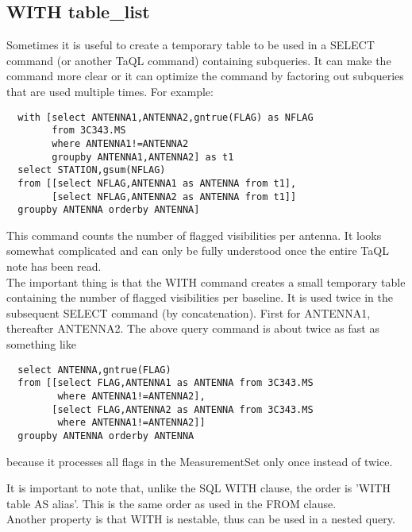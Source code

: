 \subsection{\label{TAQL:WITH}WITH table\_list}
Sometimes it is useful to create a temporary table to be used
in a SELECT command (or another TaQL command) containing
subqueries. It can make the command more clear or it can optimize the
command by factoring out subqueries that are used multiple times.
For example:
\begin{verbatim}
  with [select ANTENNA1,ANTENNA2,gntrue(FLAG) as NFLAG
        from 3C343.MS
        where ANTENNA1!=ANTENNA2
        groupby ANTENNA1,ANTENNA2] as t1
  select STATION,gsum(NFLAG)
  from [[select NFLAG,ANTENNA1 as ANTENNA from t1],
        [select NFLAG,ANTENNA2 as ANTENNA from t1]]
  groupby ANTENNA orderby ANTENNA]
\end{verbatim}
This command counts the number of flagged visibilities per antenna.
It looks somewhat complicated and can only be fully understood
once the entire TaQL note has been read.
\\The important thing is that the WITH command creates a small
temporary table containing the number of 
flagged visibilities per baseline. It is used twice in the subsequent
SELECT command (by concatenation). First for ANTENNA1, thereafter
ANTENNA2.
The above query command is about twice as fast as something like
\begin{verbatim}
  select ANTENNA,gntrue(FLAG)
  from [[select FLAG,ANTENNA1 as ANTENNA from 3C343.MS
         where ANTENNA1!=ANTENNA2],
        [select FLAG,ANTENNA2 as ANTENNA from 3C343.MS
         where ANTENNA1!=ANTENNA2]]
  groupby ANTENNA orderby ANTENNA
\end{verbatim}
because it processes all flags in the MeasurementSet  only once instead of twice.

It is important to note that, unlike the SQL WITH clause, the order is
'WITH table AS alias'. This is the same order as used in the FROM clause.
\\Another property is that WITH is nestable, thus can be used in a nested query.

